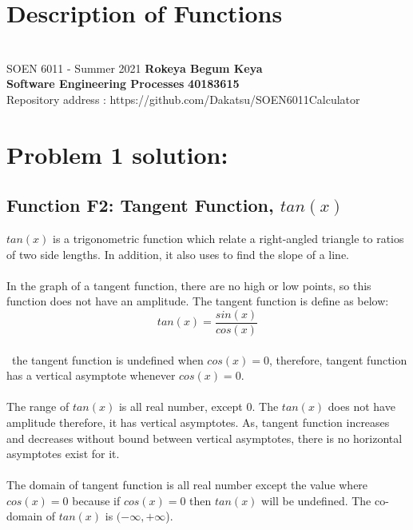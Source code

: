 \documentclass[a4paper, 11pt]{report}
\begin{document}
\tableofcontents
\newpage
{}
\section*{Description of Functions}
\section*{}
\normalsize {SOEN 6011 - Summer 2021} \hfill \textbf{Rokeya Begum Keya} \\
\textbf{ Software Engineering Processes}  \hfill \textbf{40183615} \\
\hfill Repository address : https://github.com/Dakatsu/SOEN6011Calculator
\\
\section*{Problem 1 solution:}
 \subsection*{ Function F2: Tangent Function, $tan(x)$ } 
 \normalsize{$tan(x)$ is a trigonometric function which relate a right-angled triangle to ratios of two side lengths. In addition, it also uses to find the slope of a line.} 
 \\\\
 \normalsize{In the graph of a tangent function, there are no high or low points, so this function does not have an amplitude. The tangent function is define as below: \[tan(x) = \frac{sin(x)}{cos(x)}\] }
 \\\
 \normalsize{the tangent function is undefined when $cos(x) = 0 $, therefore, tangent function has a vertical asymptote whenever $cos(x) = 0 $. }
 \\\\
 \normalsize{ The range of $tan(x)$ is all real number, except 0. The $tan(x)$ does not have amplitude therefore, it has vertical asymptotes. As, tangent function increases and decreases without bound between vertical asymptotes, there is no horizontal asymptotes exist for it.}
 \\\\
 \normalsize{The domain of tangent function is all real number except the value where $cos(x) = 0$ because if $cos(x) = 0$ then $tan(x)$ will be undefined. The co-domain of $tan(x)$ is \((-\infty, +\infty\)).}
\pagebreak
\end{document}
